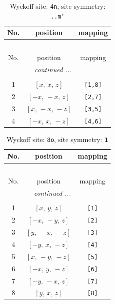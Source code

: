 \documentclass[fleqn,8pt]{jsarticle}
\begin{document}
\renewcommand{\arraystretch}{1.2}
\begin{longtable}{ccc}
\caption{Wyckoff site: {\tt 4n}, site symmetry: {\tt ..m'}}
 \\
 \hline \hline
No. & position & mapping \\ \hline \endfirsthead

\multicolumn{2}{l}{\tablename\ \thetable{}} \\
 \hline \hline
No. & position & mapping \\ \hline \endhead

 \hline \hline
\multicolumn{2}{r}{\footnotesize\it continued ...} \\ \endfoot

 \hline \hline
\multicolumn{2}{r}{} \\ \endlastfoot

1 & $\left[ x,\, x,\, z \right]$ & {\tt [1,8]} \\ \hline
2 & $\left[ - x,\, - x,\, z \right]$ & {\tt [2,7]} \\ \hline
3 & $\left[ x,\, - x,\, - z \right]$ & {\tt [3,5]} \\ \hline
4 & $\left[ - x,\, x,\, - z \right]$ & {\tt [4,6]} \\
\end{longtable}
\renewcommand{\arraystretch}{1.2}
\begin{longtable}{ccc}
\caption{Wyckoff site: {\tt 8o}, site symmetry: {\tt 1}}
 \\
 \hline \hline
No. & position & mapping \\ \hline \endfirsthead

\multicolumn{2}{l}{\tablename\ \thetable{}} \\
 \hline \hline
No. & position & mapping \\ \hline \endhead

 \hline \hline
\multicolumn{2}{r}{\footnotesize\it continued ...} \\ \endfoot

 \hline \hline
\multicolumn{2}{r}{} \\ \endlastfoot

1 & $\left[ x,\, y,\, z \right]$ & {\tt [1]} \\ \hline
2 & $\left[ - x,\, - y,\, z \right]$ & {\tt [2]} \\ \hline
3 & $\left[ y,\, - x,\, - z \right]$ & {\tt [3]} \\ \hline
4 & $\left[ - y,\, x,\, - z \right]$ & {\tt [4]} \\ \hline
5 & $\left[ x,\, - y,\, - z \right]$ & {\tt [5]} \\ \hline
6 & $\left[ - x,\, y,\, - z \right]$ & {\tt [6]} \\ \hline
7 & $\left[ - y,\, - x,\, z \right]$ & {\tt [7]} \\ \hline
8 & $\left[ y,\, x,\, z \right]$ & {\tt [8]} \\
\end{longtable}
\end{document}
